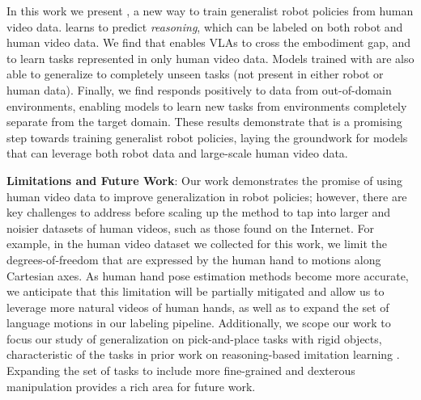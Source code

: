 In this work we present \ACRO, a new way to train generalist robot policies from human video data. \ACRO learns to predict \textit{reasoning}, which can be labeled on both robot and human video data. We find that \ACRO enables VLAs to cross the embodiment gap, and to learn tasks represented in only human video data. Models trained with \ACRO are also able to generalize to completely unseen tasks (not present in either robot or human data). Finally, we find \ACRO responds positively to data from out-of-domain environments, enabling models to learn new tasks from environments completely separate from the target domain. These results demonstrate that \ACRO is a promising step towards training generalist robot policies, laying the groundwork for models that can leverage both robot data and large-scale human video data.

\smallskip \noindent \textbf{Limitations and Future Work}:
Our work demonstrates the promise of using human video data to improve generalization in robot policies; however, there are key challenges to address before scaling up the method to tap into larger and noisier datasets of human videos, such as those found on the Internet. For example, in the human video dataset we collected for this work, we limit the degrees-of-freedom that are expressed by the human hand to motions along Cartesian axes. As human hand pose estimation methods become more accurate, we anticipate that this limitation will be partially mitigated and allow us to leverage more natural videos of  human hands, as well as to expand the set of language motions in our labeling pipeline. Additionally, we scope our work to focus our study of generalization on pick-and-place tasks with rigid objects, characteristic of the tasks in prior work on reasoning-based imitation learning \cite{zawalski2024robotic}. Expanding the set of tasks to include more fine-grained and dexterous manipulation provides a rich area for future work.
